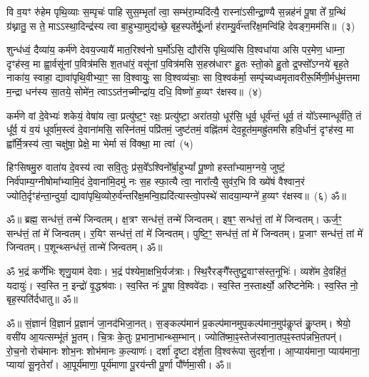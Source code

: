 वि व॒यꣳ रु॑हेम पृथि॒व्याः स॒म्पृचः॑ पाहि सुस॒म्भृता᳚ त्वा॒ सम्भ॑रा॒म्यदि॑त्यै॒ रास्ना॑\-ऽसीन्द्रा॒ण्यै स॒न्नह॑नं पू॒षा ते᳚ ग्र॒न्थिं ग्र॑थ्नातु॒ स ते॒ मा\-ऽऽ\-स्था॒दिन्द्र॑स्य त्वा बा॒हुभ्या॒मुद्य॑च्छे॒ बृह॒स्पते᳚र्मू॒र्ध्ना ह॑राम्यु॒र्व॑न्तरि॑क्ष॒मन्वि॑हि देवङ्ग॒मम॑सि॥~(३)

शुन्ध॑ध्वं॒ दैव्या॑य॒ कर्म॑णे देवय॒ज्यायै॑ मात॒रिश्व॑नो घ॒र्मो॑\-ऽसि॒ द्यौर॑सि पृथि॒व्य॑सि वि॒श्वधा॑या असि पर॒मेण॒ धाम्ना॒ दृꣳह॑स्व॒ मा ह्वा॒र्वसू॑नां प॒वित्र॑मसि श॒तधा॑रं॒ वसू॑नां प॒वित्र॑मसि स॒हस्र॑धारꣳ हु॒तः स्तो॒को हु॒तो द्र॒फ्सो᳚\-ऽग्नये॑ बृह॒ते नाका॑य॒ स्वाहा॒ द्यावा॑\-पृथि॒वीभ्या॒ꣳ॒ सा वि॒श्वायुः॒ सा वि॒श्वव्य॑चाः॒ सा वि॒श्वक॑र्मा॒ सम्पृ॑च्यध्वमृतावरीरू॒र्मिणी॒र्मधु॑मत्तमा म॒न्द्रा धन॑स्य सा॒तये॒ सोमे॑न॒ त्वा\-ऽऽ\-त॑न॒च्मीन्द्रा॑य॒ दधि॒ विष्णो॑ ह॒व्यꣳ र॑क्षस्व॥~(४)

कर्म॑णे वां दे॒वेभ्यः॑ शकेयं॒ वेषा॑य त्वा॒ प्रत्यु॑ष्ट॒ꣳ॒ रक्षः॒ प्रत्यु॑ष्टा॒ अरा॑तयो॒ धूर॑सि॒ धूर्व॒ धूर्व॑न्तं॒ धूर्व॒ तं यो᳚\-ऽस्मान्धूर्व॑ति॒ तं धू᳚र्व॒ यं व॒यं धूर्वा॑म॒स्त्वं दे॒वाना॑मसि॒ सस्नि॑तमं॒ पप्रि॑तमं॒ जुष्ट॑तमं॒ वह्नि॑तमं देव॒हूत॑म॒मह्रु॑तमसि हवि॒र्धानं॒ दृꣳह॑स्व॒ मा ह्वा᳚र्मि॒त्रस्य॑ त्वा॒ चक्षु॑षा॒ प्रेक्षे॒ मा भेर्मा सं वि॑क्था॒ मा त्वा॑~(५)

हिꣳसिषमु॒रु वाता॑य दे॒वस्य॑ त्वा सवि॒तुः प्र॑स॒वे᳚\-ऽश्विनो᳚र्बा॒हु\-भ्यां᳚ पू॒ष्णो हस्ता᳚भ्याम॒ग्नये॒ जुष्टं॒ निर्व॑पाम्य॒ग्नी\-षोमा᳚भ्यामि॒दं दे॒वाना॑मि॒दमु॑ नः स॒ह स्फा॒त्यै त्वा॒ नारा᳚त्यै॒ सुव॑र॒भि वि ख्ये॑षं वैश्वान॒रं ज्योति॒र्दृꣳह॑न्ता॒न्दुर्या॒ द्यावा॑\-पृथि॒व्योरु॒र्व॑न्तरि॑क्ष॒\-मन्वि॒ह्यदि॑त्यास्त्वो॒\-पस्थे॑ सादया॒म्यग्ने॑ ह॒व्यꣳ र॑क्षस्व॥~(६) ॐ॥


ॐ॥ ब्रह्म॒ सन्ध॑त्तं॒ तन्मे॑ जिन्वतम्।
क्ष॒त्रꣳ सन्ध॑त्तं॒ तन्मे॑ जिन्वतम्।
इष॒ꣳ॒ सन्ध॑त्तं॒ तां मे॑ जिन्वतम्।
ऊर्ज॒ꣳ॒ सन्ध॑त्तं॒ तां मे॑ जिन्वतम्।
र॒यिꣳ सन्ध॑त्तं॒ तां मे॑ जिन्वतम्।
पुष्टि॒ꣳ॒ सन्ध॑त्तं॒ तां मे॑ जिन्वतम्।
प्र॒जाꣳ सन्ध॑त्तं॒ तां मे॑ जिन्वतम्।
प॒शून्थ्सन्ध॑त्तं॒ तान्मे॑ जिन्वतम्। ॐ॥

ॐ भ॒द्रं कर्णे॑भिः शृणु॒याम॑ देवाः। भ॒द्रं प॑श्येमा॒क्षभि॒र्यज॑त्राः।
स्थि॒रैरङ्गै᳚स्तुष्टु॒वाꣳस॑स्त॒नूभिः॑। व्यशे॑म दे॒वहि॑तं॒ यदायुः॑।
स्व॒स्ति न॒ इन्द्रो॑ वृ॒द्धश्र॑वाः। स्व॒स्ति नः॑ पू॒षा वि॒श्ववे॑दाः।
स्व॒स्ति न॒स्तार्क्ष्यो॒ अरि॑ष्टनेमिः। स्व॒स्ति नो॒ बृह॒स्पति॑र्दधातु॥ ॐ॥

ॐ॥ सं॒ज्ञानं॑ वि॒ज्ञानं॑ प्र॒ज्ञानं॑ जा॒नद॑भिजा॒नत्।
स॒ङ्कल्प॑मानं प्र॒कल्प॑मानमुप॒\-कल्प॑मान॒मुप॑कॢप्तं कॢ॒प्तम्।
श्रेयो॒ वसी॑य आ॒यत्सम्भू॑तं भू॒तम्।
चि॒त्रः के॒तुः प्र॒भाना॒भान्थ्स॒म्भान्।
ज्योति॑ष्मा॒ꣴ॒स्तेज॑स्वाना॒तप॒ꣴ॒\-स्तप॑न्नभि॒\-तपन्॑।
रो॒च॒नो रोच॑मानः शोभ॒नः शोभ॑मानः क॒ल्याणः॑।
दर्\mbox{}शा॑ दृ॒ष्टा द॑र्\mbox{}श॒ता वि॒श्वरू॑पा सुदर्\mbox{}श॒ना।
आ॒प्याय॑माना॒ प्याय॑माना॒ प्याया॑ सू॒नृतेरा᳚।
आ॒पूर्य॑माणा॒ पूर्य॑माणा पू॒रय॑न्ती पू॒र्णा पौ᳚र्णमा॒सी। ॐ॥

